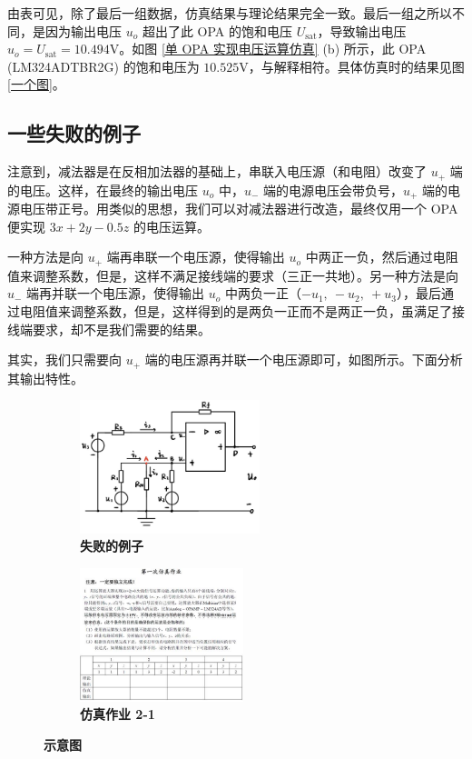 \documentclass[UTF8]{report}
\theoremstyle{MyLineTheoremStyle} %
\theoremstyle{MyBlockTheoremStyle} %
\theoremstyle{MySubsubsectionStyle} %
\begin{document}
由表可见，除了最后一组数据，仿真结果与理论结果完全一致。最后一组之所以不同，是因为输出电压 $u_o$ 超出了此 OPA 的饱和电压 $U_{\text{sat}}$，导致输出电压 $u_o = U_{\text{sat}} = 10.494 \mathrm{V}$。如图 \ref{单 OPA 实现电压运算仿真} (b) 所示，此 OPA (LM324ADTBR2G) 的饱和电压为 $10.525 \mathrm{V}$，与解释相符。具体仿真时的结果见图 \ref{一个图}。


\subsection{一些失败的例子}
注意到，减法器是在反相加法器的基础上，串联入电压源（和电阻）改变了 $u_+$ 端的电压。这样，在最终的输出电压 $u_o$ 中，$u_-$ 端的电源电压会带负号，$u_+$ 端的电源电压带正号。用类似的思想，我们可以对减法器进行改造，最终仅用一个 OPA 便实现 $3x+2y-0.5z$ 的电压运算。

一种方法是向 $u_+$ 端再串联一个电压源，使得输出 $u_o$ 中两正一负，然后通过电阻值来调整系数，但是，这样不满足接线端的要求（三正一共地）。另一种方法是向 $u_-$ 端再并联一个电压源，使得输出 $u_o$ 中两负一正（$-u_1,\ -u_2,\ +u_3$），最后通过电阻值来调整系数，但是，这样得到的是两负一正而不是两正一负，虽满足了接线端要求，却不是我们需要的结果。

其实，我们只需要向 $u_+$ 端的电压源再并联一个电压源即可，如图所示。下面分析其输出特性。

\begin{figure}[H]\centering
\begin{subfigure}[t]{0.43\textwidth}\centering
    \includegraphics[height=110pt]{assets/3/失败的例子.png}
    \caption{\bfseries 失败的例子 }
\end{subfigure}\begin{subfigure}[t]{0.43\textwidth}\centering
    \includegraphics[height=110pt]{assets/3/image (5).jpg}
    \caption{\bfseries 仿真作业 2-1 }
\end{subfigure}
\caption{\bfseries 示意图 }\label{示意图}
\end{figure}
\end{document}
